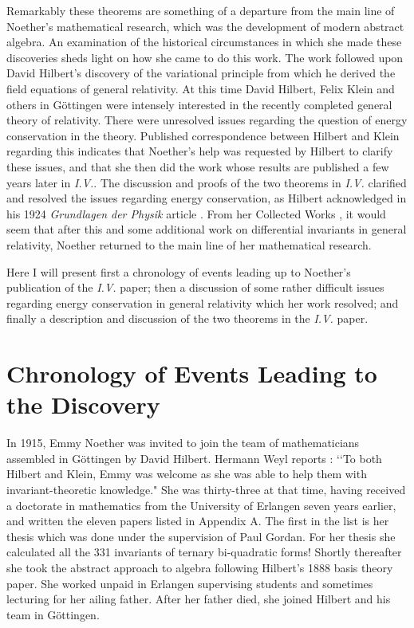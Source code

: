 \documentclass[12pt]{article}
\begin{document}
Remarkably these theorems are something of a departure from the main line of Noether's
mathematical research, which was the development of modern abstract algebra.  An examination
of the historical circumstances in which she made these discoveries sheds light on how she came to do this work.
  The work  followed upon David Hilbert's discovery
of the variational principle from which he derived
  the field equations of
general relativity.  
At this time 
 David Hilbert, Felix Klein and others in G\"{o}ttingen were intensely  interested in the recently  completed general theory of relativity. There were
unresolved issues regarding the question of energy conservation in the theory.
Published correspondence \cite{klein} 
between Hilbert and Klein regarding this indicates that   Noether's help was requested by Hilbert to clarify these
issues, and that she
then did the work whose results are published a few years later in {\it{I.V.}}. 
The discussion and proofs of  the two theorems  in {\it{I.V.}} clarified and
resolved the issues regarding energy conservation, as Hilbert acknowledged
in his 1924 {\it{Grundlagen der Physik}} article \cite{hilbert1}. From her Collected Works \cite{publist}, it would
seem that after this and some additional work on
differential invariants in general relativity\cite{paper1}, Noether returned to the main line
of her mathematical research.

Here I will present first a chronology of events leading up to Noether's publication of the
{\it{I.V.}} paper;  then a discussion of some rather difficult issues regarding
energy conservation in general relativity which her work resolved; and finally a
description and discussion of the two theorems in the {\it{I.V.}} paper.





\section{Chronology of Events Leading to the Discovery}

In 1915, Emmy Noether was invited to join the team of mathematicians assembled
in G\"{o}ttingen by David Hilbert. Hermann Weyl reports \cite{weyl}: \lq\lq To
both Hilbert and Klein, Emmy was  welcome as she was able to help them with 
invariant-theoretic knowledge." She was  thirty-three at that time, having
received a doctorate in mathematics from the University of Erlangen seven years
earlier, and  written the eleven  papers listed in Appendix A. 
The first in the list is
 her thesis which was
done under  the supervision of Paul Gordan. For her thesis 
 she 
calculated  all the 331  invariants of ternary bi-quadratic forms!  Shortly
thereafter she took the abstract approach to algebra following 
 Hilbert's 1888 basis theory paper. She worked unpaid in Erlangen supervising
students and sometimes lecturing for her ailing father. After her father died,
she joined Hilbert and his team in G\"{o}ttingen. \cite{Dick}
\end{document}
